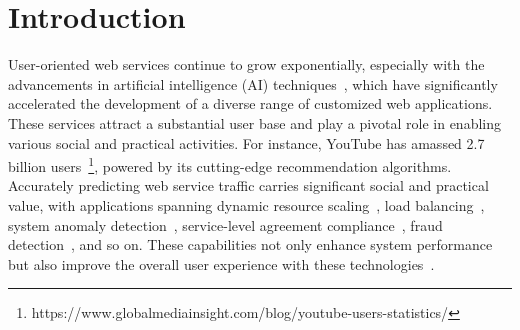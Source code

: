 \section{Introduction}

User-oriented web services continue to grow exponentially, especially with the advancements in artificial intelligence (AI) techniques~\cite{shen2024artificial, martin2020ai, tian-etal-2024-generic}, which have significantly accelerated the development of a diverse range of customized web applications. 
These services attract a substantial user base and play a pivotal role in enabling various social and practical activities. 
For instance, YouTube has amassed 2.7 billion users~\footnote{https://www.globalmediainsight.com/blog/youtube-users-statistics/}, powered by its cutting-edge recommendation algorithms.
Accurately predicting web service traffic carries significant social and practical value, with applications spanning dynamic resource scaling~\cite{pan2023magicscaler,zou2024optscaler}, load balancing~\cite{pavlenko2024vertically}, system anomaly detection~\cite{mitropoulou2024anomaly}, service-level agreement compliance~\cite{liao2024retrospecting}, fraud detection~\cite{Al-talak2021}, and so on. These capabilities not only enhance system performance but also improve the overall user experience with these technologies~\cite{kumar2024tpmcf}.

